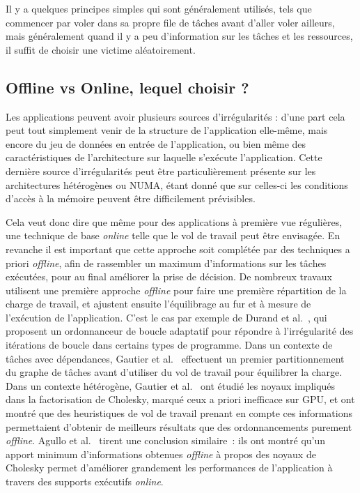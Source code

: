 Il y a quelques principes simples qui sont généralement utilisés, tels que commencer par voler dans sa propre file de tâches avant d'aller voler ailleurs, mais généralement quand il y a peu d'information sur les tâches et les ressources, il suffit de choisir une victime aléatoirement.


\subsection{Offline vs Online, lequel choisir ?}

Les applications peuvent avoir plusieurs sources d'irrégularités : d'une part cela peut tout simplement venir de la structure de l'application elle-même, mais encore du jeu de données en entrée de l'application, ou bien même des caractéristiques de l'architecture sur laquelle s'exécute l'application.
Cette dernière source d'irrégularités peut être particulièrement présente sur les architectures hétérogènes ou NUMA, étant donné que sur celles-ci les conditions d'accès à la mémoire peuvent être difficilement prévisibles.

Cela veut donc dire que même pour des applications à première vue régulières, une technique de base \emph{online} telle que le vol de travail peut être envisagée.
En revanche il est important que cette approche soit complétée par des techniques a priori \emph{offline}, afin de rassembler un maximum d'informations sur les tâches exécutées, pour au final améliorer la prise de décision.
De nombreux travaux utilisent une première approche \emph{offline} pour faire une première répartition de la charge de travail, et ajustent ensuite l'équilibrage au fur et à mesure de l'exécution de l'application.
C'est le cas par exemple de Durand et al.~\cite{Durand2013}, qui proposent un ordonnanceur de boucle adaptatif pour répondre à l'irrégularité des itérations de boucle dans certains types de programme.
Dans un contexte de tâches avec dépendances, Gautier et al.~\cite{Gautier2007}  effectuent un premier partitionnement du graphe de tâches avant d'utiliser du vol de travail pour équilibrer la charge.
Dans un contexte hétérogène, Gautier et al.~\cite{Gautier2013} ont étudié les noyaux impliqués dans la factorisation de Cholesky, marqué ceux a priori inefficace sur GPU, et ont montré que des heuristiques de vol de travail prenant en compte ces informations permettaient d'obtenir de meilleurs résultats que des ordonnancements purement \emph{offline}.
Agullo et al.~\cite{Agullo2016} tirent une conclusion similaire~: ils ont montré qu'un apport minimum d'informations obtenues \emph{offline} à propos des noyaux de Cholesky permet d'améliorer grandement les performances de l'application à travers des supports exécutifs \emph{online}.
